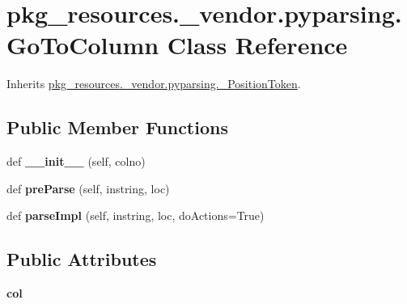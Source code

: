 \hypertarget{classpkg__resources_1_1__vendor_1_1pyparsing_1_1_go_to_column}{}\section{pkg\+\_\+resources.\+\_\+vendor.\+pyparsing.\+Go\+To\+Column Class Reference}
\label{classpkg__resources_1_1__vendor_1_1pyparsing_1_1_go_to_column}


Inherits \hyperlink{classpkg__resources_1_1__vendor_1_1pyparsing_1_1___position_token}{pkg\+\_\+resources.\+\_\+vendor.\+pyparsing.\+\_\+\+Position\+Token}.

\subsection*{Public Member Functions}
\begin{DoxyCompactItemize}
\item 
\mbox{\label{classpkg__resources_1_1__vendor_1_1pyparsing_1_1_go_to_column_a314918f1005e4bfb6649a8001e6e820f}} 
def {\bfseries \+\_\+\+\_\+init\+\_\+\+\_\+} (self, colno)
\item 
\mbox{\label{classpkg__resources_1_1__vendor_1_1pyparsing_1_1_go_to_column_abcd0917652e6776658421fed551615e6}} 
def {\bfseries pre\+Parse} (self, instring, loc)
\item 
\mbox{\label{classpkg__resources_1_1__vendor_1_1pyparsing_1_1_go_to_column_ac8904fde06ff717d5332a65b4c390148}} 
def {\bfseries parse\+Impl} (self, instring, loc, do\+Actions=True)
\end{DoxyCompactItemize}
\subsection*{Public Attributes}
\begin{DoxyCompactItemize}
\item 
\mbox{\label{classpkg__resources_1_1__vendor_1_1pyparsing_1_1_go_to_column_ae9800213fb14132f231e388ed2a323e3}} 
{\bfseries col}
\end{DoxyCompactItemize}
